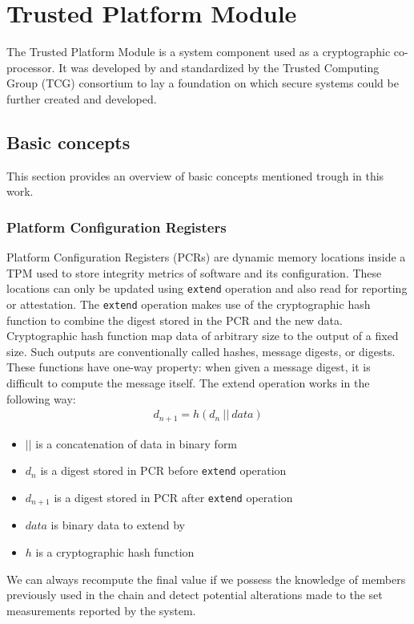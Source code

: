 \chapter{Trusted Platform Module}
The Trusted Platform Module is a system component used as a cryptographic co-processor. It was developed by and standardized by the Trusted Computing Group (TCG) consortium to lay a foundation on which secure systems could be further created and developed. 

\section{Basic concepts}
This section provides an overview of basic concepts mentioned trough in this work.

\subsection{Platform Configuration Registers}
Platform Configuration Registers (PCRs) are dynamic memory locations inside a TPM used to store integrity metrics of software and its configuration. These locations can only be updated using \texttt{extend} operation and also read for reporting or attestation. The \texttt{extend} operation makes use of the cryptographic hash function to combine the digest stored in the PCR and the new data. Cryptographic hash function map data of arbitrary size to the output of a fixed size. Such outputs are conventionally called hashes, message digests, or digests. These functions have one-way property: when given a message digest, it is difficult  to compute the message itself. The extend operation works in the following way:
\begin{align*}
    d_{n+1} = h(d_{n}\ ||\ data)
\end{align*}
\begin{itemize}
    \item $||$ is a concatenation of data in binary form
    \item $ d_{n} $ is a digest stored in PCR before \texttt{extend} operation
    \item $ d_{n+1} $ is a digest stored in PCR after \texttt{extend} operation
    \item $ data $ is binary data to extend by
    \item $ h $ is a cryptographic hash function
\end{itemize}

We can always recompute the final value if we possess the knowledge of members previously used in the chain and detect potential alterations made to the set measurements reported by the system. 



